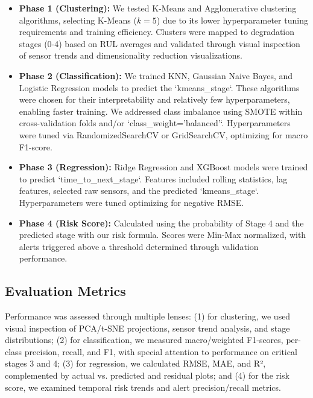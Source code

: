 \begin{itemize}
    \item \textbf{Phase 1 (Clustering):} We tested K-Means and Agglomerative clustering algorithms, selecting K-Means ($k=5$) due to its lower hyperparameter tuning requirements and training efficiency. Clusters were mapped to degradation stages (0-4) based on RUL averages and validated through visual inspection of sensor trends and dimensionality reduction visualizations.

    \item \textbf{Phase 2 (Classification):} We trained KNN, Gaussian Naive Bayes, and Logistic Regression models to predict the `kmeans\_stage`. These algorithms were chosen for their interpretability and relatively few hyperparameters, enabling faster training. We addressed class imbalance using SMOTE within cross-validation folds and/or `class\_weight='balanced'`. Hyperparameters were tuned via RandomizedSearchCV or GridSearchCV, optimizing for macro F1-score.

    \item \textbf{Phase 3 (Regression):} Ridge Regression and XGBoost models were trained to predict `time\_to\_next\_stage`. Features included rolling statistics, lag features, selected raw sensors, and the predicted `kmeans\_stage`. Hyperparameters were tuned optimizing for negative RMSE.

    \item \textbf{Phase 4 (Risk Score):} Calculated using the probability of Stage 4 and the predicted stage with our risk formula. Scores were Min-Max normalized, with alerts triggered above a threshold determined through validation performance.
\end{itemize}

\subsection{Evaluation Metrics}
Performance was assessed through multiple lenses: (1) for clustering, we used visual inspection of PCA/t-SNE projections, sensor trend analysis, and stage distributions; (2) for classification, we measured macro/weighted F1-scores, per-class precision, recall, and F1, with special attention to performance on critical stages 3 and 4; (3) for regression, we calculated RMSE, MAE, and R², complemented by actual vs. predicted and residual plots; and (4) for the risk score, we examined temporal risk trends and alert precision/recall metrics.
